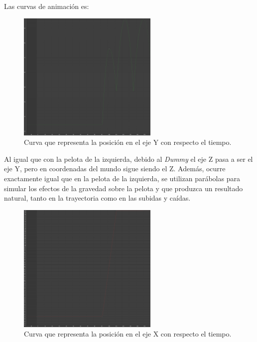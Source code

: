 \bigskip

Las curvas de animación es:

\begin{figure}[H]
    \centering
    \includegraphics[width=0.6\textwidth]{imagenes/curvas/PR/pelota/green.png}
    \caption{Curva que representa la posición en el eje Y con respecto el tiempo.}
 \end{figure}

 Al igual que con la pelota de la izquierda, debido al \textit{Dummy} el eje Z pasa a ser el eje Y, pero en coordenadas del mundo sigue siendo el Z. Además, ocurre exactamente igual que en la pelota de la izquierda, se utilizan parábolas para simular los efectos de la gravedad sobre la pelota y que produzca un resultado natural, tanto en la trayectoria como en las subidas y caídas.

 \begin{figure}[H]
    \centering
    \includegraphics[width=0.6\textwidth]{imagenes/curvas/PR/pelota/red.png}
    \caption{Curva que representa la posición en el eje X con respecto el tiempo.}
 \end{figure}

